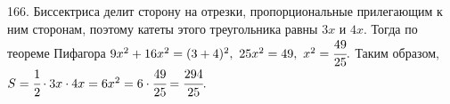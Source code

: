 166. Биссектриса делит сторону на отрезки, пропорциональные прилегающим к ним сторонам, поэтому катеты этого треугольника равны $3x$ и $4x.$ Тогда по теореме Пифагора $9x^2+16x^2=(3+4)^2,\ 25x^2=49,\ x^2=\cfrac{49}{25}.$ Таким образом, $S=\cfrac{1}{2}\cdot3x\cdot4x=6x^2=6\cdot\cfrac{49}{25}=\cfrac{294}{25}.$\\
